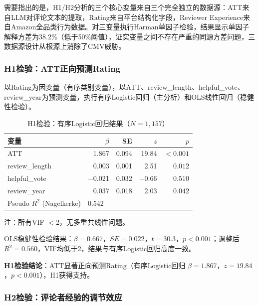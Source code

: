 需要指出的是，H1/H2分析的三个核心变量来自三个完全独立的数据源：ATT来自LLM对评论文本的提取，Rating来自平台结构化字段，Reviewer Experience来自Amazon全品类行为数据。对三变量执行Harman单因子检验，结果显示单因子解释方差为38.2\%（低于50\%阈值），证实变量之间不存在严重的同源方差问题，三数据源设计从根源上消除了CMV威胁。

\subsubsection{H1检验：ATT正向预测Rating}

以Rating为因变量（有序类别变量），以ATT、review\_length、helpful\_vote、review\_year为预测变量，执行有序Logistic回归（主分析）和OLS线性回归（稳健性检验）。

\begin{table}[htbp]
\centering
\caption{H1检验：有序Logistic回归结果（$N=1{,}157$）}
\label{tab:h1_ordinal}
\begin{threeparttable}
\begin{tabular}{@{}lrrrr@{}}
\toprule
变量 & $\beta$ & SE & $z$ & $p$ \\
\midrule
ATT & 1.867 & 0.094 & 19.84 & $<0.001$ \\
review\_length & 0.003 & 0.001 & 2.51 & $0.012$ \\
helpful\_vote & $-$0.021 & 0.032 & $-$0.66 & $0.510$ \\
review\_year & 0.037 & 0.018 & 2.03 & $0.042$ \\
\midrule
Pseudo $R^2$ (Nagelkerke) & \multicolumn{4}{l}{0.542} \\
\bottomrule
\end{tabular}
\begin{tablenotes}
\small
\item 注：所有VIF $<2$，无多重共线性问题。
\end{tablenotes}
\end{threeparttable}
\end{table}

OLS稳健性检验结果：$\beta=0.667$，$SE=0.022$，$t=30.3$，$p<0.001$；调整后$R^2=0.560$，VIF均低于2，结果与有序Logistic回归高度一致。

\textbf{H1检验结论}：ATT显著正向预测Rating（有序Logistic回归 $\beta=1.867$，$z=19.84$，$p<0.001$），H1获得支持。

\subsubsection{H2检验：评论者经验的调节效应}

